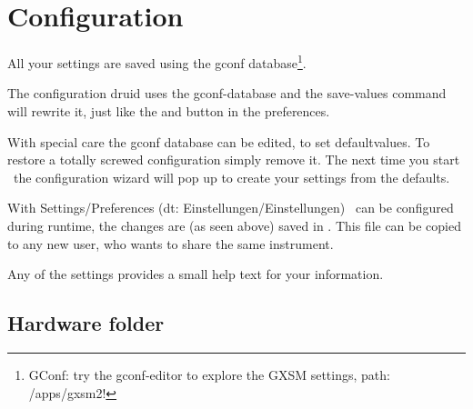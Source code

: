 

\chapter{Configuration}
\label{ch:config}

All your settings are saved using the gconf database\footnote{GConf:
  try the gconf-editor to explore the GXSM settings, path:
  /apps/gxsm2!}.

The configuration druid uses the gconf-database and the save-values
command will rewrite it, just like the  and
 button in the preferences.

With special care the gconf database can be edited, to set defaultvalues.
To restore a totally screwed configuration simply remove it. 
The next time you start \Gxsm\ the configuration wizard will pop
up to create your settings from the defaults.

With Settings/Preferences (dt: Einstellungen/Einstellungen) \Gxsm\ can
be configured during runtime, the changes are (as seen above) 
saved in . This file can be copied to any new user,
who wants to share the same instrument.

Any of the settings provides a small help text for your information.


\section{Hardware folder}
\label{sec:conf:hardware}


